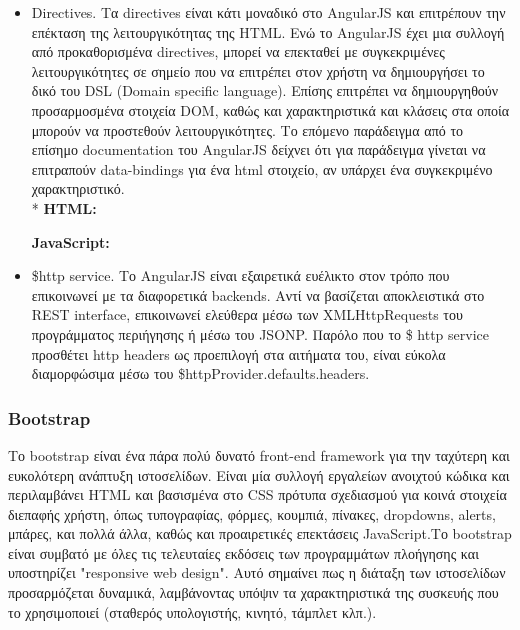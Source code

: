 \begin{itemize}
	\item Directives. Τα directives είναι κάτι μοναδικό στο AngularJS και επιτρέπουν την επέκταση της λειτουργικότητας της HTML. Ενώ το AngularJS έχει μια συλλογή από προκαθορισμένα directives, μπορεί να επεκταθεί με συγκεκριμένες λειτουργικότητες σε σημείο που να επιτρέπει στον χρήστη να δημιουργήσει το δικό του DSL (Domain specific language). Επίσης επιτρέπει να δημιουργηθούν προσαρμοσμένα στοιχεία DOM, καθώς και χαρακτηριστικά και κλάσεις στα οποία μπορούν να προστεθούν λειτουργικότητες. Το επόμενο παράδειγμα από το επίσημο documentation του AngularJS δείχνει ότι για παράδειγμα γίνεται να επιτραπούν data-bindings για ένα html στοιχείο, αν υπάρχει ένα συγκεκριμένο χαρακτηριστικό. \cite{angular-directives}
\\*
\textbf{HTML:}

	
 
\textbf{JavaScript:}

	


	\item \$http service. Το AngularJS είναι εξαιρετικά ευέλικτο στον τρόπο που επικοινωνεί με τα διαφορετικά backends. Αντί να βασίζεται αποκλειστικά στο REST interface, επικοινωνεί ελεύθερα μέσω των XMLHttpRequests του προγράμματος περιήγησης ή μέσω του JSONP. Παρόλο που το \$ http service προσθέτει http headers ως προεπιλογή στα αιτήματα του,  είναι εύκολα διαμορφώσιμα μέσω του \$httpProvider.defaults.headers.
	\end{itemize}




		\subsubsection{Bootstrap}
	Το bootstrap είναι ένα πάρα πολύ δυνατό front-end framework για την ταχύτερη και ευκολότερη ανάπτυξη ιστοσελίδων. Είναι μία συλλογή εργαλείων ανοιχτού κώδικα και περιλαμβάνει HTML και βασισμένα στο CSS πρότυπα σχεδιασμού για κοινά στοιχεία διεπαφής χρήστη, όπως τυπογραφίας, φόρμες, κουμπιά, πίνακες, dropdowns, alerts, μπάρες, και πολλά άλλα, καθώς και προαιρετικές επεκτάσεις JavaScript.Το bootstrap είναι συμβατό με όλες τις τελευταίες εκδόσεις των προγραμμάτων πλοήγησης και υποστηρίζει "responsive web design". Αυτό σημαίνει πως η διάταξη των ιστοσελίδων προσαρμόζεται δυναμικά, λαμβάνοντας υπόψιν τα χαρακτηριστικά της συσκευής που το χρησιμοποιεί (σταθερός υπολογιστής, κινητό, τάμπλετ κλπ.). 
	
